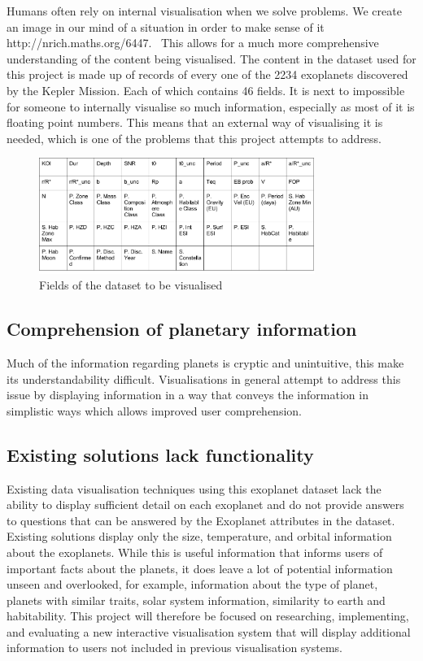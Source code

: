 Humans often rely on internal visualisation when we solve problems. We create an image in our mind of a situation in order to make sense of it http://nrich.maths.org/6447.~ This allows for a much more comprehensive understanding of the content being visualised. The content in the dataset used for this project is made up of records of every one of the 2234 exoplanets discovered by the Kepler Mission. Each of which contains 46 fields. It is next to impossible for someone to internally visualise so much information, especially as most of it is floating point numbers. This means that an external way of visualising it is needed, which is one of the problems that this project attempts to address. 
\begin{figure}[h!]
  \centering
      \includegraphics[width=0.8\textwidth]{images/data.png}
  \caption{Fields of the dataset to be visualised}
\end{figure}

\subsection{Comprehension of planetary information}
Much of the information regarding planets is cryptic and unintuitive, this make its understandability difficult. Visualisations in general attempt to address this issue by displaying information in a way that conveys the information in simplistic ways which allows improved user comprehension.

\subsection{Existing solutions lack functionality}
Existing data visualisation techniques using this exoplanet dataset lack the ability to display sufficient detail on each exoplanet and do not provide answers to questions that can be answered by the Exoplanet attributes in the dataset. Existing solutions display only the size, temperature, and orbital information about the exoplanets. While this is useful information that informs users of important facts about the planets, it does leave a lot of potential information unseen and overlooked, for example, information about the type of planet, planets with similar traits, solar system information, similarity to earth and habitability. This project will therefore be focused on researching, implementing, and evaluating a new interactive visualisation system that will display additional information to users not included in previous visualisation systems.

